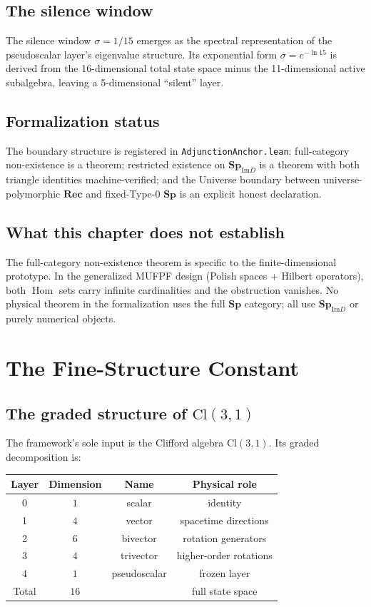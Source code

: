 \documentclass[11pt,twoside]{article}
\newcommand{\rec}{\mathbf{Rec}}
\newcommand{\spc}{\mathbf{Sp}}
\newcommand{\spimd}{\mathbf{Sp}_{\mathrm{Im}D}}
\newcommand{\Homt}{\operatorname{Hom}}
\begin{document}
\subsection{The silence window}
The silence window $\sigma = 1/15$ emerges as the spectral representation of the pseudoscalar layer's eigenvalue structure. Its exponential form $\sigma = e^{-\ln 15}$ is derived from the 16-dimensional total state space minus the 11-dimensional active subalgebra, leaving a 5-dimensional ``silent'' layer.

\subsection{Formalization status}
The boundary structure is registered in \texttt{AdjunctionAnchor.lean}: full-category non-existence is a theorem; restricted existence on $\spimd$ is a theorem with both triangle identities machine-verified; and the Universe boundary between universe-polymorphic $\rec$ and fixed-Type-0 $\spc$ is an explicit honest declaration.

\subsection{What this chapter does not establish}
The full-category non-existence theorem is specific to the finite-dimensional prototype. In the generalized MUFPF design (Polish spaces + Hilbert operators), both $\Homt$ sets carry infinite cardinalities and the obstruction vanishes. No physical theorem in the formalization uses the full $\spc$ category; all use $\spimd$ or purely numerical objects.

\section{The Fine-Structure Constant}
\label{sec:alpha}

\subsection{The graded structure of $\mathrm{Cl}(3,1)$}
The framework's sole input is the Clifford algebra $\mathrm{Cl}(3,1)$. Its graded decomposition is:
\begin{center}
\begin{tabular}{c c c c}
Layer & Dimension & Name & Physical role \\
\hline
0 & $1$ & scalar & identity \\
1 & $4$ & vector & spacetime directions \\
2 & $6$ & bivector & rotation generators \\
3 & $4$ & trivector & higher-order rotations \\
4 & $1$ & pseudoscalar & frozen layer \\
\hline
Total & $16$ & & full state space \\
\end{tabular}
\end{center}
\end{document}
